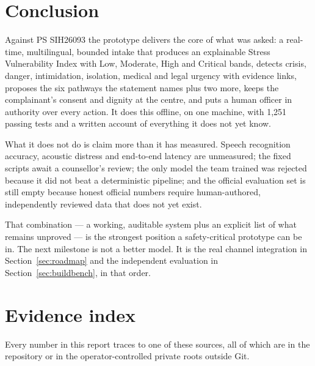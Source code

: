\documentclass[11pt,a4paper]{article}
\begin{document}
\section{Conclusion}

Against PS SIH26093 the prototype delivers the core of what was asked: a real-time, multilingual,
bounded intake that produces an explainable Stress Vulnerability Index with Low, Moderate, High and
Critical bands, detects crisis, danger, intimidation, isolation, medical and legal urgency with
evidence links, proposes the six pathways the statement names plus two more, keeps the complainant's
consent and dignity at the centre, and puts a human officer in authority over every action. It does
this offline, on one machine, with 1{,}251 passing tests and a written account of everything it does
not yet know.

What it does not do is claim more than it has measured. Speech recognition accuracy, acoustic
distress and end-to-end latency are unmeasured; the fixed scripts await a counsellor's review; the
only model the team trained was rejected because it did not beat a deterministic pipeline; and the
official evaluation set is still empty because honest official numbers require human-authored,
independently reviewed data that does not yet exist.

That combination --- a working, auditable system plus an explicit list of what remains unproved --- is
the strongest position a safety-critical prototype can be in. The next milestone is not a better
model. It is the real channel integration in Section~\ref{sec:roadmap} and the independent evaluation
in Section~\ref{sec:buildbench}, in that order.

\appendix
\section{Evidence index}
Every number in this report traces to one of these sources, all of which are in the repository or in
the operator-controlled private roots outside Git.
\end{document}
